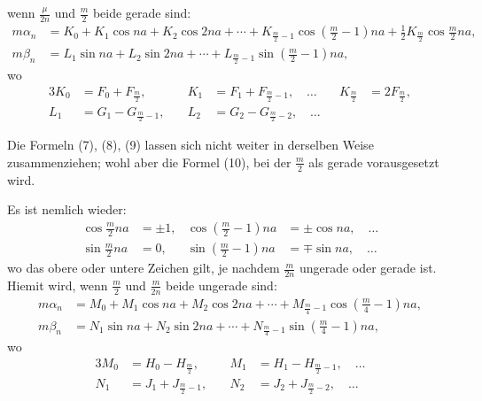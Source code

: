 \documentclass[12pt,a4paper]{article}
\begin{document}
wenn $\frac{\mu}{2n}$ und $\frac{m}{2}$ beide gerade sind:
\begin{equation}
\tag{9}
\begin{aligned}
m\alpha_n &= K_0 + K_1 \cos na + K_2 \cos 2na + \cdots + K_{\frac{m}{2}-1} \cos(\tfrac{m}{2}-1)na + \tfrac{1}{2}K_{\frac{m}{2}} \cos\tfrac{m}{2}na,\\
m\beta_n &= L_1 \sin na + L_2 \sin 2na + \cdots + L_{\frac{m}{2}-1} \sin(\tfrac{m}{2}-1)na,
\end{aligned}
\end{equation}
wo
\begin{alignat*}{3}
K_0 &= F_0 + F_{\frac{m}{2}}, \quad & K_1 &= F_1 + F_{\frac{m}{2}-1}, \quad \ldots \quad & K_{\frac{m}{2}} &= 2F_{\frac{m}{2}},\\
L_1 &= G_1 - G_{\frac{m}{2}-1}, \quad & L_2 &= G_2 - G_{\frac{m}{2}-2}, \quad \ldots
\end{alignat*}

Die Formeln (7), (8), (9) lassen sich nicht weiter in derselben Weise zusammenziehen; wohl aber die Formel (10), bei der $\frac{m}{2}$ als gerade vorausgesetzt wird.

Es ist nemlich wieder:
\begin{align*}
\cos\tfrac{m}{2}na &= \pm 1, & \cos(\tfrac{m}{2}-1)na &= \pm\cos na, \quad \ldots\\
\sin\tfrac{m}{2}na &= 0, & \sin(\tfrac{m}{2}-1)na &= \mp\sin na, \quad \ldots
\end{align*}
wo das obere oder untere Zeichen gilt, je nachdem $\frac{m}{2n}$ ungerade oder gerade ist. Hiemit wird, wenn $\frac{m}{2}$ und $\frac{m}{2n}$ beide ungerade sind:
\begin{equation}
\tag{10}
\begin{aligned}
m\alpha_n &= M_0 + M_1 \cos na + M_2 \cos 2na + \cdots + M_{\frac{m}{4}-1} \cos(\tfrac{m}{4}-1)na,\\
m\beta_n &= N_1 \sin na + N_2 \sin 2na + \cdots + N_{\frac{m}{4}-1} \sin(\tfrac{m}{4}-1)na,
\end{aligned}
\end{equation}
wo
\begin{alignat*}{3}
M_0 &= H_0 - H_{\frac{m}{2}}, \quad & M_1 &= H_1 - H_{\frac{m}{2}-1}, \quad \ldots\\
N_1 &= J_1 + J_{\frac{m}{2}-1}, \quad & N_2 &= J_2 + J_{\frac{m}{2}-2}, \quad \ldots
\end{alignat*}
\end{document}
